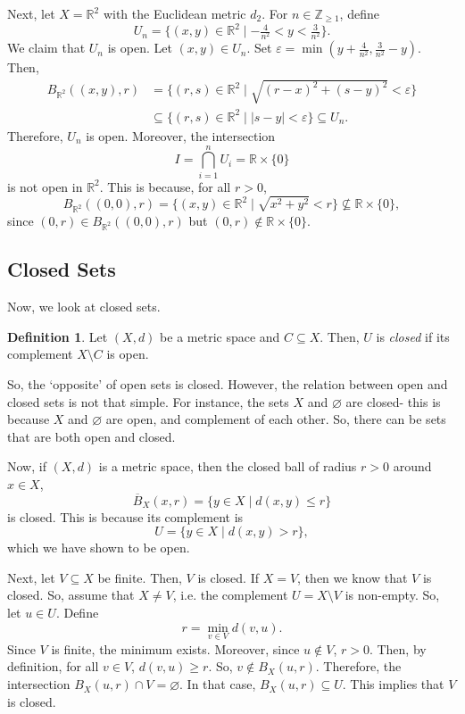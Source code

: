 \documentclass[a4paper, openany]{memoir}
\theoremstyle{definition}
\newtheorem{definition}{Definition}[section]
\theoremstyle{plain}
\begin{document}
Next, let $X = \mathbb{R}^2$ with the Euclidean metric $d_2$. For $n \in \mathbb{Z}_{\geqslant 1}$, define
\[U_n = \{(x, y) \in \mathbb{R}^2 \mid -\tfrac{4}{n^2} < y < \tfrac{3}{n^2}\}.\]
We claim that $U_n$ is open. Let $(x, y) \in U_n$. Set $\varepsilon = \min(y + \frac{4}{n^2}, \frac{3}{n^2} - y)$. Then, 
\begin{align*}
    B_{\mathbb{R}^2}((x, y), r) &= \{(r, s) \in \mathbb{R}^2 \mid \sqrt{(r-x)^2 + (s-y)^2} < \varepsilon\} \\
    &\subseteq \{(r, s) \in \mathbb{R}^2 \mid |s-y| < \varepsilon\} \subseteq U_n.
\end{align*}
\noindent Therefore, $U_n$ is open. Moreover, the intersection
\[I = \bigcap_{i=1}^n U_i = \mathbb{R} \times \{0\}\]
is not open in $\mathbb{R}^2$. This is because, for all $r > 0$, 
\[B_{\mathbb{R}^2}((0, 0), r) = \{(x, y) \in \mathbb{R}^2 \mid \sqrt{x^2 + y^2} < r\} \not\subseteq \mathbb{R} \times \{0\},\]
since $(0,r) \in B_{\mathbb{R}^2}((0, 0), r)$ but $(0, r) \not\in \mathbb{R} \times \{0\}$.

\subsection{Closed Sets}
Now, we look at closed sets.
\begin{definition}
Let $(X, d)$ be a metric space and $C \subseteq X$. Then, $U$ is \emph{closed} if its complement $X \setminus C$ is open.
\end{definition}
\noindent So, the `opposite' of open sets is closed. However, the relation between open and closed sets is not that simple. For instance, the sets $X$ and $\varnothing$ are closed- this is because $X$ and $\varnothing$ are open, and complement of each other. So, there can be sets that are both open and closed.

Now, if $(X, d)$ is a metric space, then the closed ball of radius $r > 0$ around $x \in X$,
\[\overline{B}_X(x, r) = \{y \in X \mid d(x, y) \leqslant r\}\]
is closed. This is because its complement is
\[U = \{y \in X \mid d(x, y) > r\},\]
which we have shown to be open. 

Next, let $V \subseteq X$ be finite. Then, $V$ is closed. If $X = V$, then we know that $V$ is closed. So, assume that $X \neq V$, i.e. the complement $U = X \setminus V$ is non-empty. So, let $u \in U$. Define
\[r = \min_{v \in V} d(v, u).\]
Since $V$ is finite, the minimum exists. Moreover, since $u \not\in V$, $r > 0$. Then, by definition, for all $v \in V$, $d(v, u) \geqslant r$. So, $v \not\in B_X(u, r)$. Therefore, the intersection $B_X(u, r) \cap V = \varnothing$. In that case, $B_X(u, r) \subseteq U$. This implies that $V$ is closed.
\end{document}
